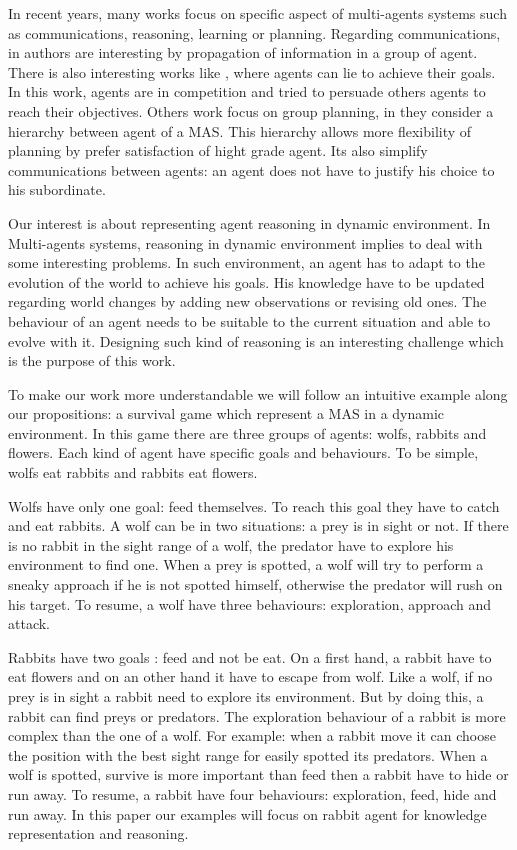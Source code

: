 \documentclass{aamas2012}
\begin{document}
	In recent years, many works focus on specific aspect of multi-agents systems such as communications, reasoning, learning or planning.
	Regarding communications, in \cite{DBLP:conf/ecai/BourgneIM10, DBLP:conf/lads/BourgneIM10} authors are interesting 
	by propagation of information in a group of agent.
	There is also interesting works like \cite{DBLP:conf/ijcai/SakamaSP11}, where agents can lie to achieve their goals.
	In this work, agents are in competition and tried to persuade others agents to reach their objectives.
	Others work focus on group planning, in \cite{DBLP:conf/clima/NieuwenborghVHV06} they consider a hierarchy between agent of a MAS.
	This hierarchy allows more flexibility of planning by prefer satisfaction of hight grade agent.
	Its also simplify communications between agents: an agent does not have to justify his choice to his subordinate.
	
	Our interest is about representing agent reasoning in dynamic environment.
	In Multi-agents systems, reasoning in dynamic environment implies to deal with some interesting problems.
	In such environment, an agent has to adapt to the evolution of the world to achieve his goals.
	His knowledge have to be updated regarding world changes by adding new observations or revising old ones.
	The behaviour of an agent needs to be suitable to the current situation and able to evolve with it.
	Designing such kind of reasoning is an interesting challenge which is the purpose of this work.
	
	To make our work more understandable we will follow an intuitive example along our propositions: a survival game which represent a MAS in a dynamic environment.
	In this game there are three groups of agents: wolfs, rabbits and flowers.
	Each kind of agent have specific goals and behaviours.
	To be simple, wolfs eat rabbits and rabbits eat flowers.
	
	Wolfs have only one goal: feed themselves.
	To reach this goal they have to catch and eat rabbits.
	A wolf can be in two situations: a prey is in sight or not.
	If there is no rabbit in the sight range of a wolf, the predator have to explore his environment to find one.
	When a prey is spotted, a wolf will try to perform a sneaky approach if he is not spotted himself, otherwise the predator will rush on his target.
	To resume, a wolf have three behaviours: exploration, approach and attack.
	
	Rabbits have two goals : feed and not be eat.
	On a first hand, a rabbit have to eat flowers and on an other hand it have to escape from wolf.
	Like a wolf, if no prey is in sight a rabbit need to explore its environment.
	But by doing this, a rabbit can find preys or predators.
	The exploration behaviour of a rabbit is more complex than the one of a wolf.
	For example: when a rabbit move it can choose the position with the best sight range for easily spotted its predators.
	When a wolf is spotted, survive is more important than feed then a rabbit have to hide or run away.
	To resume, a rabbit have four behaviours: exploration, feed, hide and run away.
	In this paper our examples will focus on rabbit agent for knowledge representation and reasoning.
	
\end{document}

